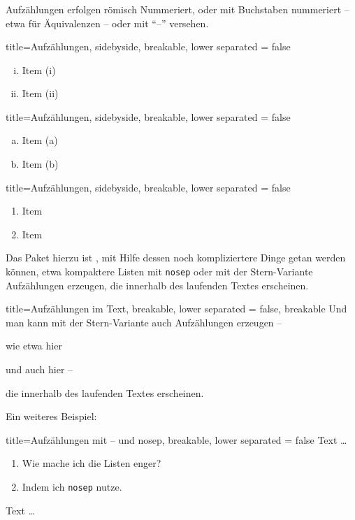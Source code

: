 \begin{refsection}
\subsubsection{}
Aufzählungen erfolgen römisch Nummeriert, oder mit Buchstaben nummeriert -- etwa für Äquivalenzen -- oder mit \enquote{--} versehen.
%
\begin{tcblisting}{title=Aufzählungen, sidebyside, breakable,  lower separated = false}
\begin{enumerate}[(i)]
	\item 
	Item (i)
	\item
	Item (ii)
\end{enumerate}
\end{tcblisting}
%
\begin{tcblisting}{title=Aufzählungen, sidebyside, breakable,  lower separated = false}
\begin{enumerate}[(a)]
	\item 
	Item (a)
	\item
	Item (b)
\end{enumerate}
\end{tcblisting}
%
\medskip
\begin{tcblisting}{title=Aufzählungen, sidebyside, breakable,  lower separated = false}
\begin{enumerate}[--]
	\item 
	Item 
	\item
	Item 
\end{enumerate}
\end{tcblisting}
\medskip
Das Paket hierzu ist \textcite{enumitem}, mit Hilfe dessen noch kompliziertere Dinge getan werden können, etwa kompaktere Listen mit \texttt{nosep} oder mit der Stern-Variante Aufzählungen erzeugen, die innerhalb des laufenden Textes erscheinen.
\medskip
\begin{tcblisting}{title=Aufzählungen im Text, breakable, lower separated = false, breakable}
Und man kann mit der Stern-Variante auch Aufzählungen erzeugen -- 
%
\begin{enumerate*}[(i)]
	\item 
	wie etwa hier  
	\item
	und auch hier -- 
\end{enumerate*}
%
die innerhalb des laufenden Textes erscheinen.
\end{tcblisting}
\medskip
Ein weiteres Beispiel:
\begin{tcblisting}{title=Aufzählungen mit -- und nosep, breakable,  lower separated = false}
Text \ldots
%
\medskip
\begin{enumerate}[--, nosep]
	\item 
	Wie mache ich die Listen enger?
	\item
	Indem ich \texttt{nosep} nutze.
\end{enumerate}
\medskip
%
Text \ldots 
\end{tcblisting}

\end{refsection}
